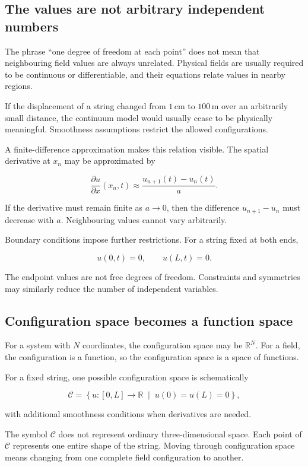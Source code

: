\subsection{The values are not arbitrary independent numbers}

The phrase ``one degree of freedom at each point'' does not mean that neighbouring field values are always unrelated. Physical fields are usually required to be continuous or differentiable, and their equations relate values in nearby regions.

If the displacement of a string changed from \(1\,\mathrm{cm}\) to \(100\,\mathrm{m}\) over an arbitrarily small distance, the continuum model would usually cease to be physically meaningful. Smoothness assumptions restrict the allowed configurations.

A finite-difference approximation makes this relation visible. The spatial derivative at \(x_{n}\) may be approximated by

\[
\frac{\partial u}{\partial x}(x_{n},t)
\approx
\frac{u_{n+1}(t)-u_{n}(t)}{a}.
\]

If the derivative must remain finite as \(a\to 0\), then the difference \(u_{n+1}-u_{n}\) must decrease with \(a\). Neighbouring values cannot vary arbitrarily.

Boundary conditions impose further restrictions. For a string fixed at both ends,

\[
u(0,t)=0,
\qquad
u(L,t)=0.
\]

The endpoint values are not free degrees of freedom. Constraints and symmetries may similarly reduce the number of independent variables.

\subsection{Configuration space becomes a function space}

For a system with \(N\) coordinates, the configuration space may be \(\mathbb{R}^{N}\). For a field, the configuration is a function, so the configuration space is a space of functions.

For a fixed string, one possible configuration space is schematically

\[
\mathcal{C}
=
\left\{
u:[0,L]\to\mathbb{R}
\;\middle|\;
u(0)=u(L)=0
\right\},
\]

with additional smoothness conditions when derivatives are needed.

The symbol \(\mathcal{C}\) does not represent ordinary three-dimensional space. Each point of \(\mathcal{C}\) represents one entire shape of the string. Moving through configuration space means changing from one complete field configuration to another.

